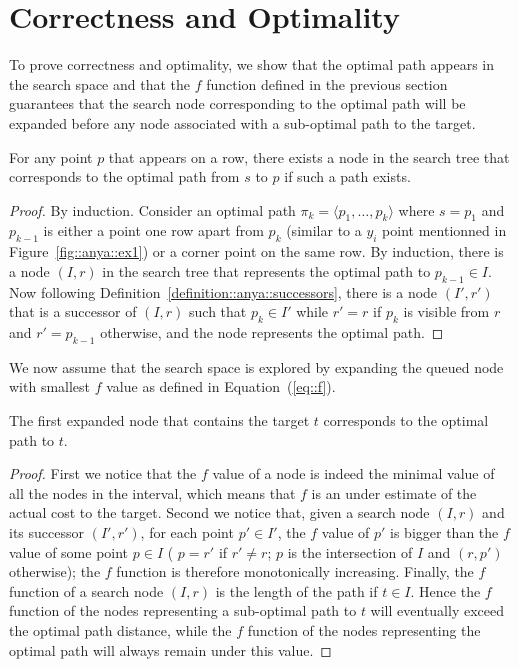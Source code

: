 \section{Correctness and Optimality}

To prove correctness and optimality, 
we show that the optimal path 
appears in the search space 
and that the $f$ function defined in the previous section 
guarantees that the search node 
corresponding to the optimal path 
will be expanded before any node 
associated with a sub-optimal path to the target.  

\begin{theorem}
  For any point $p$ that appears on a row, 
  there exists a node in the search tree 
  that corresponds to the optimal path from $s$ to $p$ 
  if such a path exists.  
\end{theorem}

\begin{proof}
  By induction.  
  Consider an optimal path 
  $\pi_k = \langle p_1,\dots,p_k\rangle$ 
  where $s = p_1$ and $p_{k-1}$ is either a point 
  one row apart from $p_k$ (similar to a $y_i$ point
  mentionned in Figure~\ref{fig::anya::ex1}) or a corner point on the same row.  
  By induction, there is a node $(I,r)$ in the search tree 
  that represents the optimal path to $p_{k-1} \in I$.  
  Now following Definition~\ref{definition::anya::successors}, 
  there is a node $(I',r')$ 
  that is a successor of $(I,r)$ 
  such that $p_k \in I'$ while $r' = r$ if $p_k$ is visible from $r$ 
  and $r' = p_{k-1}$ otherwise, and the node represents the optimal path.  
\end{proof}

We now assume that the search space is explored 
by expanding the queued node with smallest $f$ value 
as defined in Equation~(\ref{eq::f}).  

\begin{theorem}
  The first expanded node 
  that contains the target $t$ 
  corresponds to the optimal path to $t$.  
\end{theorem}

\begin{proof}
  First we notice that the $f$ value of a node 
  is indeed the minimal value of all the nodes in the interval, 
  which means that $f$ is an under estimate of the actual cost 
  to the target.  
  Second we notice that, given a search node $(I,r)$ 
  and its successor $(I',r')$, 
  for each point $p' \in I'$, 
  the $f$ value of $p'$ is bigger 
  than the $f$ value of some point $p \in I$ 
  (%
  $p = r'$ if $r' \neq r$; 
  $p$ is the intersection of $I$ and $(r,p')$ otherwise); 
  the $f$ function is therefore monotonically increasing.  
  Finally, the $f$ function of a search node $(I,r)$ 
  is the length of the path if $t \in I$.  
  Hence the $f$ function of the nodes representing 
  a sub-optimal path to $t$ 
  will eventually exceed the optimal path distance, 
  while the $f$ function of the nodes representing the optimal path 
  will always remain under this value.  
\end{proof}

